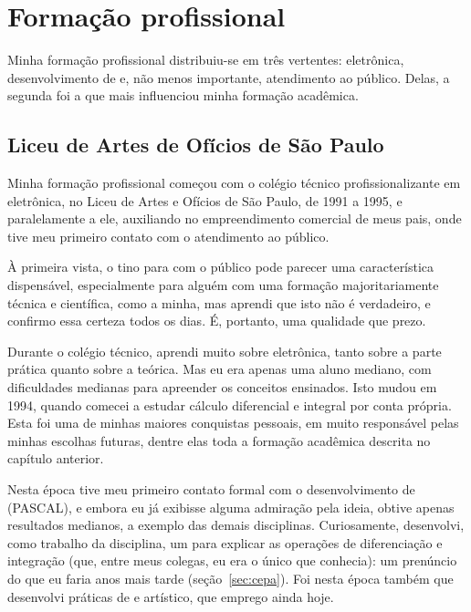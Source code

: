 \chapter{Formação profissional}
\label{cap:formacao-profissional}

Minha formação profissional distribuiu-se em três vertentes: eletrônica, desenvolvimento de  e, não menos importante, atendimento ao público. Delas, a segunda foi a que mais influenciou minha formação acadêmica.

\section{Liceu de Artes de Ofícios de São Paulo}
\label{sec:liceu}

Minha formação profissional começou com o colégio técnico profissionalizante em eletrônica, no Liceu de Artes e Ofícios de São Paulo, de 1991 a 1995, e paralelamente a ele, auxiliando no empreendimento comercial de meus pais, onde tive meu primeiro contato com o atendimento ao público.

À primeira vista, o tino para com o público pode parecer uma característica dispensável, especialmente para alguém com uma formação majoritariamente técnica e científica, como a minha, mas aprendi que isto não é verdadeiro, e confirmo essa certeza todos os dias. É, portanto, uma qualidade que prezo.

Durante o colégio técnico, aprendi muito sobre eletrônica, tanto sobre a parte prática quanto sobre a teórica. Mas eu era apenas uma aluno mediano, com dificuldades medianas para apreender os conceitos ensinados. Isto mudou em 1994, quando comecei a estudar cálculo diferencial e integral por conta própria. Esta foi uma de minhas maiores conquistas pessoais, em muito responsável pelas minhas escolhas futuras, dentre elas toda a formação acadêmica descrita no capítulo anterior.

Nesta época tive meu primeiro contato formal com o desenvolvimento de  (PASCAL), e embora eu já exibisse alguma admiração pela ideia, obtive apenas resultados medianos, a exemplo das demais disciplinas. Curiosamente, desenvolvi, como trabalho da disciplina, um  para explicar as operações de diferenciação e integração (que, entre meus colegas, eu era o único que conhecia): um prenúncio do que eu faria anos mais tarde (seção~\ref{sec:cepa}). Foi nesta época também que desenvolvi práticas de  e artístico, que emprego ainda hoje.

